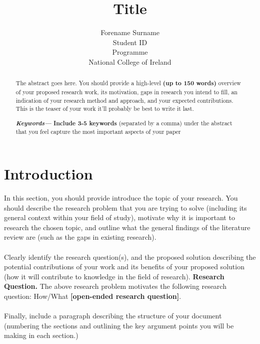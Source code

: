 \documentclass[10pt]{article}
\providecommand{\keywords}[1]
{
  \small	
  \textbf{\textit{Keywords---}} #1
}
\begin{document}
\title{\bf{Title}}%
\author{Forename Surname \\ Student ID \\ Programme \\ National College of Ireland}%


\date{}%
\maketitle



\begin{abstract} 
The abstract goes here. You should provide a high-level \textbf{(up to 150 words)} overview of your proposed research work, its motivation, gaps in research you intend to fill, an indication of your research method and approach, and your expected contributions. This is the teaser of your work it'll probably be best to write it last.

\keywords{\textbf{Include 3-5 keywords} (separated by a comma) under the abstract that you feel capture the most important aspects of your paper}
 
\end{abstract}

\section{Introduction}  

In this section, you should provide introduce the topic of your research. You should describe the research problem that you are trying to solve (including its general context within your field of study), motivate why it is important to research the chosen topic, and outline what the general findings of the literature review are (such as the gaps in existing research). 
\\\\
Clearly identify the research question(s), and the proposed solution describing the potential contributions of your work and its benefits of your proposed solution (how it will contribute to knowledge in the field of research). 
\textbf{Research Question.} The above research problem motivates the following research question: How/What \textbf{[open-ended research question]}.
\\\\
Finally, include a paragraph describing the structure of your document (numbering the sections and outlining the key argument points you will be making in each section.)
\end{document}
